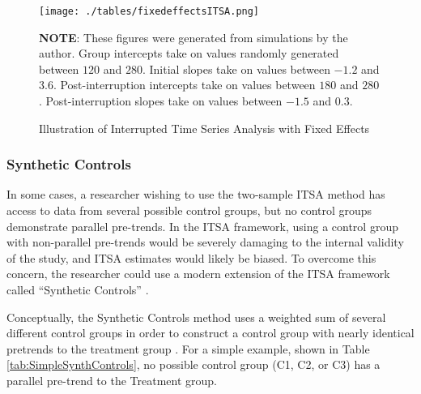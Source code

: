 \documentclass[12pt]{article}
\begin{document}
\begin{figure}
    \centering
    \caption{Illustration of Interrupted Time Series Analysis with Fixed Effects}
    \texttt{[image: ./tables/fixedeffectsITSA.png]}
    \begin{minipage}{\textwidth}
    \footnotesize
    \textbf{NOTE}: These figures were generated from simulations by the author. Group intercepts take on values randomly generated between $120$ and $280$. Initial slopes take on values between $-1.2$ and $3.6$. Post-interruption intercepts take on values between $180$ and $280$. Post-interruption slopes take on values between $-1.5$ and $0.3$.
    \end{minipage}
    \label{fig:ITSAFE}
\end{figure}


\subsubsection{Synthetic Controls}

In some cases, a researcher wishing to use the two-sample ITSA method has access to data from several possible control groups, but no control groups demonstrate parallel pre-trends. In the ITSA framework, using a control group with non-parallel pre-trends would be severely damaging to the internal validity of the study, and ITSA estimates would likely be biased. To overcome this concern, the researcher could use a modern extension of the ITSA framework called ``Synthetic Controls'' \citep{craigSyntheticControlsNew2015}.

Conceptually, the Synthetic Controls method uses a weighted sum of several different control groups in order to construct a control group with nearly identical pretrends to the treatment group \citep{abadieComparativePoliticsSynthetic2015}. For a simple example, shown in Table \ref{tab:SimpleSynthControls}, no possible control group (C1, C2, or C3) has a parallel pre-trend to the Treatment group.
\end{document}
